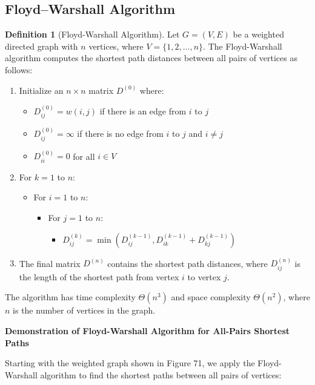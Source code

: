 \documentclass{article}
\theoremstyle{definition}
\newtheorem{definition}{Definition}
\begin{document}
\subsection{Floyd–Warshall Algorithm}
\begin{definition}[Floyd-Warshall Algorithm]
Let $G = (V, E)$ be a weighted directed graph with $n$ vertices, where $V = \{1, 2, \ldots, n\}$. The Floyd-Warshall algorithm computes the shortest path distances between all pairs of vertices as follows:

\begin{enumerate}
\item Initialize an $n \times n$ matrix $D^{(0)}$ where:
   \begin{itemize}
   \item $D^{(0)}_{ij} = w(i,j)$ if there is an edge from $i$ to $j$
   \item $D^{(0)}_{ij} = \infty$ if there is no edge from $i$ to $j$ and $i \neq j$
   \item $D^{(0)}_{ii} = 0$ for all $i \in V$
   \end{itemize}

\item For $k = 1$ to $n$:
   \begin{itemize}
   \item For $i = 1$ to $n$:
      \begin{itemize}
      \item For $j = 1$ to $n$:
         \begin{itemize}
         \item $D^{(k)}_{ij} = \min(D^{(k-1)}_{ij}, D^{(k-1)}_{ik} + D^{(k-1)}_{kj})$
         \end{itemize}
      \end{itemize}
   \end{itemize}

\item The final matrix $D^{(n)}$ contains the shortest path distances, where $D^{(n)}_{ij}$ is the length of the shortest path from vertex $i$ to vertex $j$.
\end{enumerate}

The algorithm has time complexity $\Theta(n^3)$ and space complexity $\Theta(n^2)$, where $n$ is the number of vertices in the graph.
\end{definition}

\noindent\textbf{Demonstration of Floyd-Warshall Algorithm for All-Pairs Shortest Paths}

Starting with the weighted graph shown in Figure 71, we apply the Floyd-Warshall algorithm to find the shortest paths between all pairs of vertices:
\end{document}
